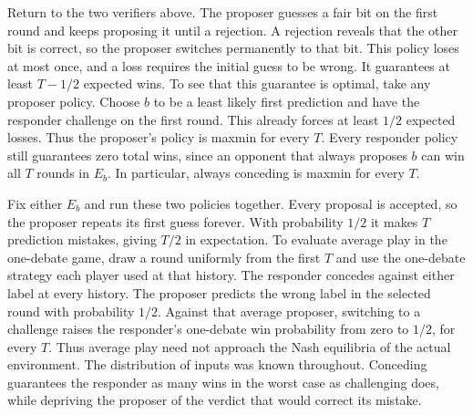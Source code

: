 \documentclass[11pt]{article}
\begin{document}
Return to the two verifiers above. The proposer guesses a fair bit on the
first round and keeps proposing it until a rejection. A rejection reveals
that the other bit is correct, so the proposer switches permanently to that
bit. This policy loses at most once, and a loss requires the initial guess
to be wrong. It guarantees at least \(T-1/2\) expected wins. To see that
this guarantee is optimal, take any proposer policy. Choose \(b\) to be a
least likely first prediction and have the responder challenge on the
first round. This already forces at least
\(1/2\) expected losses. Thus the proposer's policy is maxmin for every
\(T\). Every responder policy still guarantees zero total wins, since an
opponent that always proposes \(b\) can win all \(T\) rounds in \(E_b\).
In particular, always conceding is maxmin for every \(T\).

Fix either \(E_b\) and run these two policies together. Every proposal is
accepted, so the proposer repeats its first guess forever. With probability
\(1/2\) it makes \(T\) prediction mistakes, giving \(T/2\) in expectation.
To evaluate average play in the one-debate game, draw a round uniformly
from the first \(T\) and use the one-debate strategy each player used at
that history. The responder concedes against either label at every history.
The proposer predicts the wrong label in the selected round with
probability \(1/2\). Against that average proposer, switching to a
challenge raises the responder's one-debate win probability from zero to
\(1/2\), for every \(T\). Thus average play need not approach the Nash
equilibria of the actual environment. The distribution of inputs was known
throughout. Conceding guarantees the responder as many wins in the worst
case as challenging does, while depriving the proposer of the verdict
that would correct its mistake.
\end{document}
